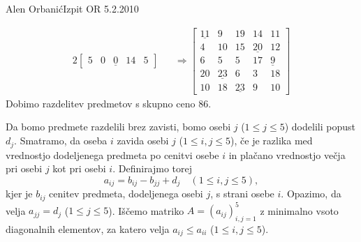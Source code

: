 \begin{naloga}{Alen Orbanić}{Izpit OR 5.2.2010}
\begin{odgovor}
\begin{alignat*}{2}
\begin{bmatrix}
 5 & 0 & \underline{0} & 14 & 5
\end{bmatrix}
&&\Rightarrow
\begin{bmatrix}
\underline{11} &  9 & 19 & 14 & 11 \\
 4 & 10 & 15 & \underline{20} & 12 \\
 6 &  5 &  5 & 17 & \underline{9} \\
20 & \underline{23} &  6 &  3 & 18 \\
10 & 18 & \underline{23} &  9 & 10
\end{bmatrix}
\end{alignat*}
Dobimo razdelitev predmetov s skupno ceno $86$.

Da bomo predmete razdelili brez zavisti,
bomo osebi $j$ ($1 \le j \le 5$) dodelili popust $d_j$.
Smatramo, da oseba $i$ zavida osebi $j$ ($1 \le i, j \le 5$),
če je razlika med vrednostjo dodeljenega predmeta po cenitvi osebe $i$
in plačano vrednostjo večja pri osebi $j$ kot pri osebi $i$.
Definirajmo torej
$$
a_{ij} = b_{ij} - b_{jj} + d_j
\quad (1 \le i, j \le 5),
$$
kjer je $b_{ij}$ cenitev predmeta, dodeljenega osebi $j$, s strani osebe $i$.
Opazimo, da velja $a_{jj} = d_j$ ($1 \le j \le 5$).
Iščemo matriko $A = (a_{ij})_{i,j=1}^5$
z minimalno vsoto diagonalnih elementov,
za katero velja $a_{ij} \le a_{ii}$ ($1 \le i, j \le 5$).


\end{odgovor}
\end{naloga}
